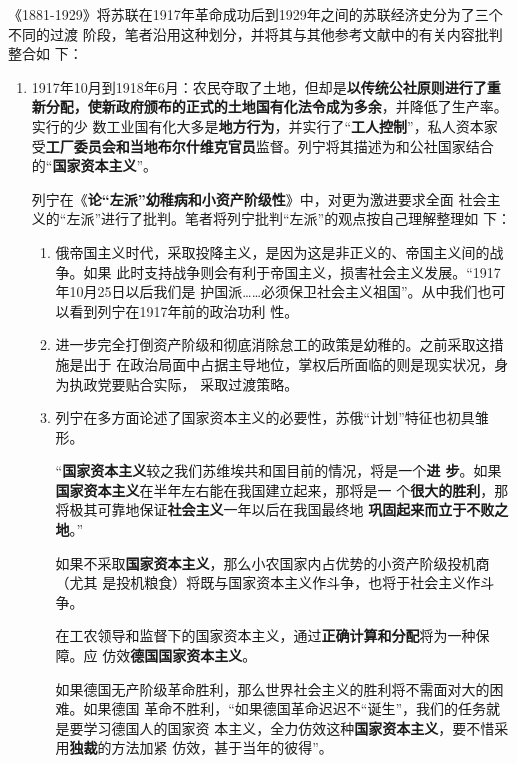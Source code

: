 《1881-1929》将苏联在1917年革命成功后到1929年之间的苏联经济史分为了三个不同的过渡
阶段，笔者沿用这种划分，并将其与其他参考文献中的有关内容批判整合如
下：
\begin{enumerate}
\item 1917年10月到1918年6月：农民夺取了土地，但却是\textbf{以传统公社原则进行了重
    新分配，使新政府颁布的正式的土地国有化法令成为多余}，并降低了生产率。实行的少
  数工业国有化大多是\textbf{地方行为}，并实行了“\textbf{工人控制}”，私人资本家
  受\textbf{工厂委员会和当地布尔什维克官员}监督。列宁将其描述为和公社国家结合
  的“\textbf{国家资本主义}”。

  列宁在《\textbf{论“左派”幼稚病和小资产阶级性}》中，对更为激进要求全面
  社会主义的``左派''进行了批判。笔者将列宁批判``左派''的观点按自己理解整理如
  下：
  \begin{enumerate}
  \item 俄帝国主义时代，采取投降主义，是因为这是非正义的、帝国主义间的战争。如果
    此时支持战争则会有利于帝国主义，损害社会主义发展。``1917年10月25日以后我们是
    护国派……必须保卫社会主义祖国''。从中我们也可以看到列宁在1917年前的政治功利
    性。
    
  \item 进一步完全打倒资产阶级和彻底消除怠工的政策是幼稚的。之前采取这措施是出于
    在政治局面中占据主导地位，掌权后所面临的则是现实状况，身为执政党要贴合实际，
    采取过渡策略。
    
  \item 列宁在多方面论述了国家资本主义的必要性，苏俄``计划''特征也初具雏形。

    ``\textbf{国家资本主义}较之我们苏维埃共和国目前的情况，将是一个\textbf{进
      步}。如果\textbf{国家资本主义}在半年左右能在我国建立起来，那将是一
    个\textbf{很大的胜利}，那将极其可靠地保证\textbf{社会主义}一年以后在我国最终地
    \textbf{巩固起来而立于不败之地}。''

    如果不采取\textbf{国家资本主义}，那么小农国家内占优势的小资产阶级投机商（尤其
    是投机粮食）将既与国家资本主义作斗争，也将于社会主义作斗争。

    在工农领导和监督下的国家资本主义，通过\textbf{正确计算和分配}将为一种保障。应
    仿效\textbf{德国国家资本主义}。

    如果德国无产阶级革命胜利，那么世界社会主义的胜利将不需面对大的困难。如果德国
    革命不胜利，``如果德国革命迟迟不“诞生”，我们的任务就是要学习德国人的国家资
    本主义，全力仿效这种\textbf{国家资本主义}，要不惜采用\textbf{独裁}的方法加紧
    仿效，甚于当年的彼得''。
  \end{enumerate}


\end{enumerate}

